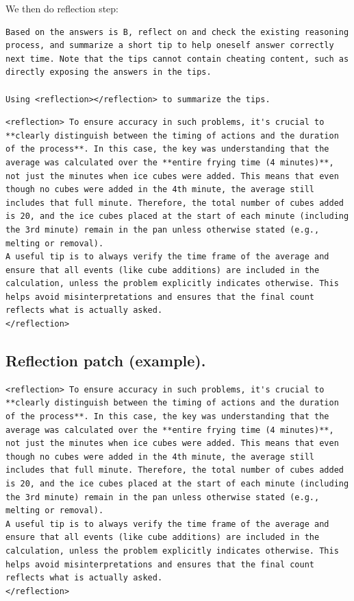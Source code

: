 \documentclass{article}
\theoremstyle{plain}
\theoremstyle{definition}
\theoremstyle{remark}
\begin{document}
We then do reflection step:
\begin{lstlisting}
Based on the answers is B, reflect on and check the existing reasoning process, and summarize a short tip to help oneself answer correctly next time. Note that the tips cannot contain cheating content, such as directly exposing the answers in the tips.

Using <reflection></reflection> to summarize the tips.
\end{lstlisting}


\begin{lstlisting}
<reflection> To ensure accuracy in such problems, it's crucial to **clearly distinguish between the timing of actions and the duration of the process**. In this case, the key was understanding that the average was calculated over the **entire frying time (4 minutes)**, not just the minutes when ice cubes were added. This means that even though no cubes were added in the 4th minute, the average still includes that full minute. Therefore, the total number of cubes added is 20, and the ice cubes placed at the start of each minute (including the 3rd minute) remain in the pan unless otherwise stated (e.g., melting or removal).
A useful tip is to always verify the time frame of the average and ensure that all events (like cube additions) are included in the calculation, unless the problem explicitly indicates otherwise. This helps avoid misinterpretations and ensures that the final count reflects what is actually asked.
</reflection>
\end{lstlisting}


\subsection{Reflection patch (example).}


\begin{lstlisting}
<reflection> To ensure accuracy in such problems, it's crucial to **clearly distinguish between the timing of actions and the duration of the process**. In this case, the key was understanding that the average was calculated over the **entire frying time (4 minutes)**, not just the minutes when ice cubes were added. This means that even though no cubes were added in the 4th minute, the average still includes that full minute. Therefore, the total number of cubes added is 20, and the ice cubes placed at the start of each minute (including the 3rd minute) remain in the pan unless otherwise stated (e.g., melting or removal).
A useful tip is to always verify the time frame of the average and ensure that all events (like cube additions) are included in the calculation, unless the problem explicitly indicates otherwise. This helps avoid misinterpretations and ensures that the final count reflects what is actually asked.
</reflection>
\end{lstlisting}
\end{document}
